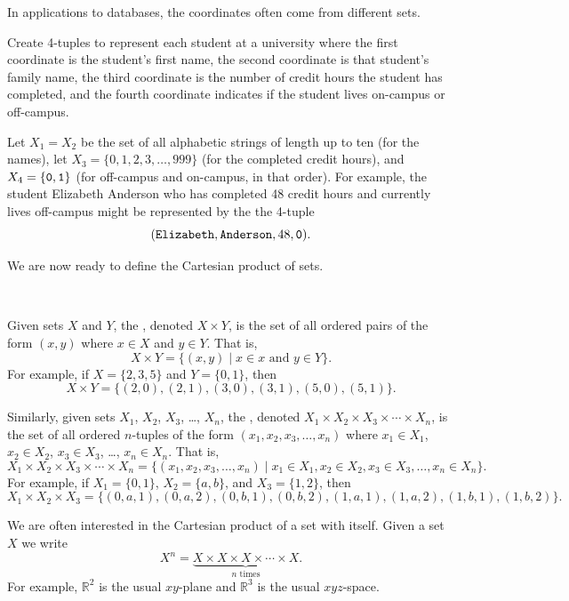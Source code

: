 In applications to databases, the coordinates often come from different sets.  

\begin{exam}
\label{exam_ordered_tuples_data}
    Create 4-tuples to represent each student at a university where the first coordinate is the student's first name, the second coordinate is that student's family name, the third coordinate is the number of credit hours the student has completed, and the fourth coordinate indicates if the student lives on-campus or off-campus.
        \begin{soln}
            Let $X_1=X_2$ be the set of all alphabetic strings of length up to ten (for the names), let $X_3=\{0,1,2,3,\ldots, 999\}$ (for the completed credit hours), and $X_4=\{\texttt{0},\texttt{1}\}$ (for off-campus and on-campus, in that order). For example, the student Elizabeth Anderson who has completed 48 credit hours and currently lives off-campus might be represented by the the 4-tuple $$(\texttt{Elizabeth}, \texttt{Anderson}, 48,\texttt{0}).$$
        \end{soln}
\end{exam}

We are now ready to define the Cartesian product of sets.

\begin{defn}
\label{defn_cart_prod_sets}
~
    \begin{apart}
        \item Given sets $X$ and $Y$, the , denoted $X \times Y$, is the set of all ordered pairs of the form $(x,y)$ where $x \in X$ and $y\in Y$.  That is,
            $$X \times Y = \{ (x,y) \mid x \in x \text{ and } y \in Y \}.$$
        For example, if $X = \{2,3,5\}$ and $Y = \{0,1\}$, then 
            $$X \times Y = \{ (2,0), (2,1), (3,0), (3,1), (5,0), (5,1)\}.$$ 
        
        \item Similarly, given sets $X_1$, $X_2$, $X_3$, \ldots, $X_n$, the , denoted $X_1 \times X_2 \times X_3 \times \cdots \times X_n$, is the set of all ordered $n$-tuples of the form $(x_1, x_2, x_3,\ldots, x_n)$ where $x_1 \in X_1$, $x_2 \in X_2$, $x_3 \in X_3$, \ldots, $x_n \in X_n$.  That is,
            $$X_1 \times X_2 \times X_3 \times \cdots \times X_n = \{(x_1, x_2, x_3, \ldots, x_n) \mid x_1 \in X_1, x_2 \in X_2, x_3 \in X_3, \ldots, x_n \in X_n\}.$$
        For example, if $X_1=\{0,1\}$, $X_2=\{a,b\}$, and $X_3 = \{1,2\}$, then
            $$X_1 \times X_2 \times X_3= \{ (0,a,1), (0,a,2), (0,b,1), (0,b,2), (1,a,1), (1,a,2), (1,b,1), (1,b,2)\}.$$

        \item We are often interested in the Cartesian product of a set with itself.  Given a set $X$ we write 
            $$X^n=\underbrace{X \times X \times X \times \cdots \times X}_{n \text{ times}}.$$
        For example, $\mathbb{R}^2$ is the usual $xy$-plane and $\mathbb{R}^3$ is the usual $xyz$-space.
    \end{apart}
\end{defn}

